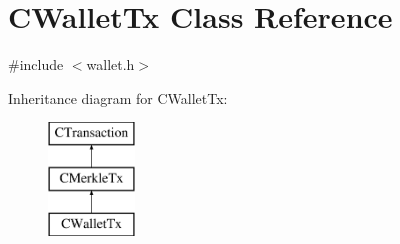\hypertarget{class_c_wallet_tx}{}\section{C\+Wallet\+Tx Class Reference}
\label{class_c_wallet_tx}


{\ttfamily \#include $<$wallet.\+h$>$}

Inheritance diagram for C\+Wallet\+Tx\+:\begin{figure}[H]
\begin{center}
\leavevmode
\includegraphics[height=3.000000cm]{class_c_wallet_tx}
\end{center}
\end{figure}
